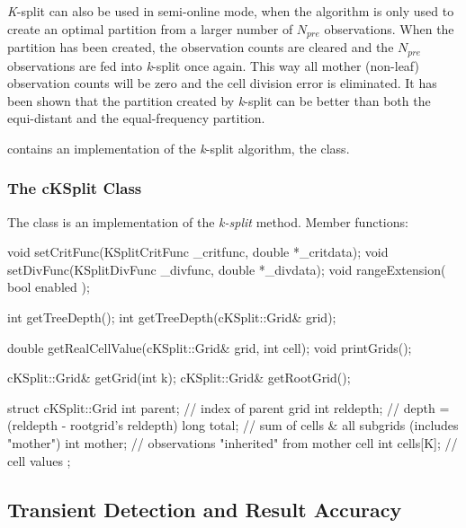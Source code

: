 \textit{K}-split can also be used in semi-online mode, when the
algorithm is only used to create an optimal partition from a larger
number of $N_{pre}$ observations. When the partition has been created,
the observation counts are cleared and the $N_{pre}$ observations are
fed into \textit{k}-split once again. This way all mother (non-leaf)
observation counts will be zero and the cell division error is
eliminated. It has been shown that the partition created by
\textit{k}-split can be better than both the equi-distant and the
equal-frequency partition.


{\opp} contains an implementation of the \textit{k}-split algorithm,
the  class.

\subsubsection{The cKSplit Class}

The  class is an implementation of the \textit{k-split} method.
Member functions:

%
%

\begin{cpp}
void setCritFunc(KSplitCritFunc _critfunc, double *_critdata);
void setDivFunc(KSplitDivFunc \_divfunc, double *\_divdata);
void rangeExtension( bool enabled );
\end{cpp}


\begin{cpp}
int getTreeDepth();
int getTreeDepth(cKSplit::Grid& grid);
\end{cpp}

\begin{cpp}
double getRealCellValue(cKSplit::Grid& grid, int cell);
void printGrids();
\end{cpp}

\begin{cpp}
cKSplit::Grid& getGrid(int k);
cKSplit::Grid& getRootGrid();
\end{cpp}

\begin{cpp}
struct cKSplit::Grid
{
  int parent;   // index of parent grid
  int reldepth; // depth = (reldepth - rootgrid's reldepth)
  long total;   // sum of cells & all subgrids (includes "mother")
  int mother;   // observations "inherited" from mother cell
  int cells[K]; // cell values
};
\end{cpp}



\subsection{Transient Detection and Result Accuracy}

